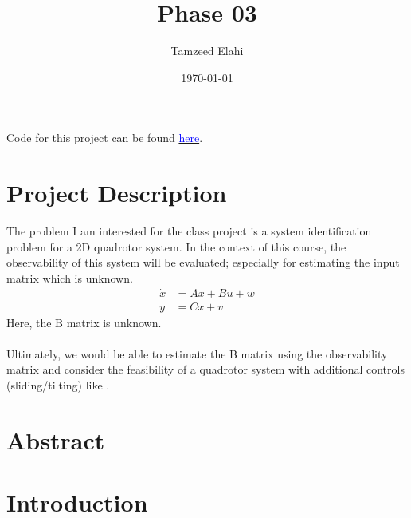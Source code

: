\documentclass[12pt]{article}
\title{Phase 03}
\author{Tamzeed Elahi}
\date{\today}
\begin{document}
\maketitle


Code for this project can be found \href{https://github.com/tamzeed-toha/Nonlinear_and_Data_Driven_Estimation/blob/main/project/phase_03.ipynb}{\textcolor{blue}{here}}.

\section*{Project Description}
The problem I am interested for the class project is a system identification problem for a 2D quadrotor system. In the context of this course, the observability of this system will be evaluated; especially for estimating the input matrix which is unknown. 
\begin{align*}
    \dot{x} &= Ax + Bu + w \\
    y &= Cx + v
\end{align*} 
Here, the B matrix is unknown. \\\\
Ultimately, we would be able to estimate the B matrix using the observability matrix and consider the feasibility of a quadrotor system with additional controls (sliding/tilting) like \cite{Nemati2014}. 

\section*{Abstract}



\section*{Introduction}
\end{document}
